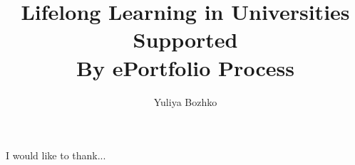 \documentclass[11pt,PhD,twoside,openright]{muthesis}
\begin{document}



\title{Lifelong Learning in Universities Supported\\ 
  By ePortfolio Process}
\author{Yuliya Bozhko}

\beforeabstract

 


\newpage
\cleardoublepage
 
I would like to thank...

\newpage
\cleardoublepage

 

\newpage
\cleardoublepage

 

\newpage
\cleardoublepage
 
\tableofcontents
\newpage
\iftablespage
	\addvspace{10pt}
    \listoftables 
    \newpage
\fi
\iffigurespage
	\addvspace{10pt}
    \listoffigures
    \newpage
\fi

\afterpreface

\pagestyle{fancy}

\fancyhead{}
\fancyhead[LE,LO]{\slshape \leftmark}

\fancyfoot{} 
\fancyfoot[LE,RO]{\thepage} 
\renewcommand{\headrulewidth}{0.4pt}
\renewcommand{\footrulewidth}{0pt}


 


 
 
 
 
 

\cleardoublepage
{} 
{}
             

\appendix







\end{document}
